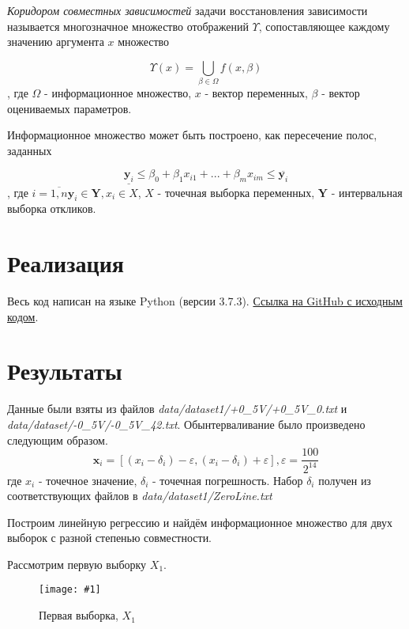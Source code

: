 \documentclass[a4paper,12pt]{article}
\newcommand{\plot}[3]{
    \begin{figure}[H]
        \begin{center}
            \texttt{[image: \#1]}
            \caption{#2}
            \label{#3}
        \end{center}
    \end{figure}
}
\begin{document}
    \textsl{Коридором совместных зависимостей} задачи восстановления зависимости
    называется многозначное множество отображений $ \Upsilon $, сопоставляющее
    каждому значению аргумента $ x $ множество
    
    \begin{equation}
        \Upsilon(x) = \bigcup_{\beta \in \Omega} f(x, \beta)
    \end{equation}
    , где $ \Omega $ - информационное множество, $ x $ - вектор переменных, $ \beta $ - вектор оцениваемых параметров. 

    Информационное множество может быть построено, как пересечение полос, заданных
    
    \begin{equation}
        \underline{\textbf{y}_i} \leq \beta_0 + \beta_1 x_{i1} + ... + \beta_m x_{im} \leq \overline{\textbf{y}_i}
    \end{equation}
    , где $ i = \overline{1, n} \textbf{y}_i \in \textbf{Y}, x_i \in X $, $ X $ - точечная выборка переменных,
    $ \textbf{Y} $ - интервальная выборка откликов.

    \section{Реализация}
    \quad Весь код написан на языке Python (версии 3.7.3).
    \href{https://github.com/kirillkuks/Intervals/tree/master/lab2}{Ссылка на GitHub с исходным кодом}.

    \section{Результаты}
    \quad Данные были взяты из файлов \textsl{data/dataset1/+0\_5V/+0\_5V\_0.txt} и \textsl{data/dataset/-0\_5V/-0\_5V\_42.txt}.
    Обынтерваливание было произведено следующим образом.
    \begin{equation}
        \textbf{x}_i = [(x_i - \delta_i) - \varepsilon, (x_i - \delta_i) + \varepsilon], \varepsilon = \frac{100}{2^{14}}
    \end{equation}
    где $ x_i $ - точечное значение, $ \delta_i $ - точечная погрешность.
    Набор $ \delta_i $ получен из соответствующих файлов в \textsl{data/dataset1/ZeroLine.txt}

    Построим линейную регрессию и найдём информационное множество для двух выборок
    с разной степенью совместности.

    Рассмотрим первую выборку $ X_1 $.
    \plot{X1}{Первая выборка, $ X_1 $}{p:sampleX1}
\end{document}
